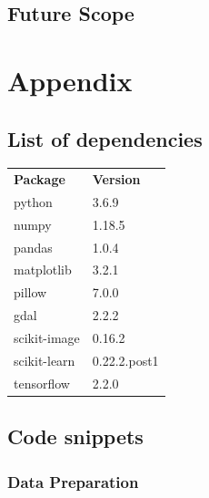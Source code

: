 \documentclass[12pt, a4paper]{report}
\begin{document}
\section{Future Scope}


\chapter*{Appendix}
\section*{List of dependencies}
\begin{tabular}{p{} p{}}
\textbf{Package} & \textbf{Version}\\
python & 3.6.9\\
numpy & 1.18.5\\
pandas & 1.0.4\\
matplotlib & 3.2.1\\
pillow & 7.0.0\\
gdal & 2.2.2\\
scikit-image & 0.16.2\\
scikit-learn & 0.22.2.post1\\
tensorflow & 2.2.0\\
\end{tabular}

\section*{Code snippets}
\subsection*{Data Preparation}
\end{document}
